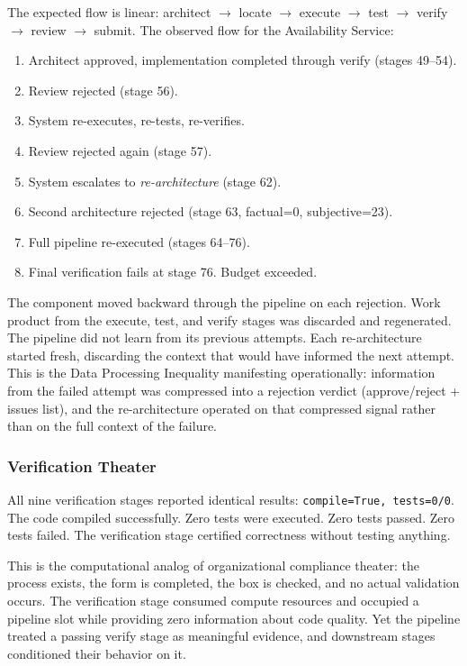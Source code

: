 \documentclass[11pt,a4paper]{article}
\begin{document}
The expected flow is linear: architect $\to$ locate $\to$ execute $\to$ test $\to$ verify $\to$ review $\to$ submit. The observed flow for the Availability Service:

\begin{enumerate}
\item Architect approved, implementation completed through verify (stages 49--54).
\item Review rejected (stage 56).
\item System re-executes, re-tests, re-verifies.
\item Review rejected again (stage 57).
\item System escalates to \emph{re-architecture} (stage 62).
\item Second architecture rejected (stage 63, factual=0, subjective=23).
\item Full pipeline re-executed (stages 64--76).
\item Final verification fails at stage 76. Budget exceeded.
\end{enumerate}

The component moved backward through the pipeline on each rejection. Work product from the execute, test, and verify stages was discarded and regenerated. The pipeline did not learn from its previous attempts. Each re-architecture started fresh, discarding the context that would have informed the next attempt. This is the Data Processing Inequality manifesting operationally: information from the failed attempt was compressed into a rejection verdict (approve/reject + issues list), and the re-architecture operated on that compressed signal rather than on the full context of the failure.

\subsubsection{Verification Theater}

All nine verification stages reported identical results: \texttt{compile=True, tests=0/0}. The code compiled successfully. Zero tests were executed. Zero tests passed. Zero tests failed. The verification stage certified correctness without testing anything.

This is the computational analog of organizational compliance theater: the process exists, the form is completed, the box is checked, and no actual validation occurs. The verification stage consumed compute resources and occupied a pipeline slot while providing zero information about code quality. Yet the pipeline treated a passing verify stage as meaningful evidence, and downstream stages conditioned their behavior on it.
\end{document}
